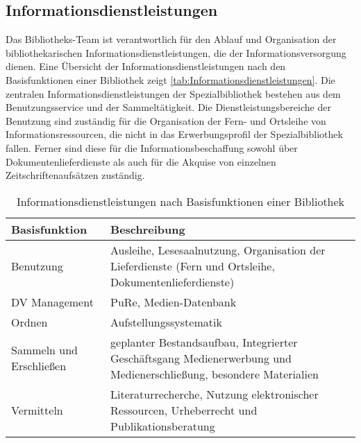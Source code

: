 \subsection{Informationsdienstleistungen}
Das Bibliotheks-Team ist verantwortlich für den Ablauf und Organisation der bibliothekarischen 
Informationsdienstleistungen, die der Informationsversorgung dienen. Eine Übersicht der Informationsdienstleistungen 
nach den Basisfunktionen einer Bibliothek\cite[S. 204 f.]{RN200} zeigt \autoref{tab:Informationsdienstleistungen}. 
Die zentralen Informationsdienstleistungen der Spezialbibliothek bestehen aus dem Benutzungsservice und der Sammeltätigkeit.
Die Dienstleistungsbereiche der Benutzung sind zuständig für die Organisation der Fern- und Ortsleihe 
von Informationsressourcen, die nicht in das Erwerbungsprofil der Spezialbibliothek fallen. 
Ferner sind diese für die Informationsbeschaffung sowohl über Dokumentenlieferdienste als auch für die 
Akquise von einzelnen Zeitschriftenaufsätzen zuständig.
\begingroup
\setlength{\tabcolsep}{12pt} %
\renewcommand{\arraystretch}{1.5} 
\begin{table}[h]
    \centering
    \begin{adjustbox}{max width=\textwidth}
    \begin{tabular}{p{}p{}}
       \toprule
       \textbf{Basisfunktion}          & \textbf{Beschreibung}\\
       \midrule
        Benutzung                               &Ausleihe, Lesesaalnutzung, Organisation der Lieferdienste (Fern und Ortsleihe, Dokumentenlieferdienste)\\
        DV Management                           &PuRe, Medien-Datenbank\\
        Ordnen                                  &Aufstellungssystematik\\
        Sammeln und Erschließen                 &geplanter Bestandsaufbau, Integrierter Geschäftsgang Medienerwerbung und Medienerschließung, besondere Materialien\\
        Vermitteln                              &Literaturrecherche, Nutzung elektronischer Ressourcen, Urheberrecht und Publikationsberatung\\
   
       \bottomrule
    \end{tabular}
    \end{adjustbox}
    \caption{%
        Informationsdienstleistungen nach Basisfunktionen einer Bibliothek
    }
    \label{tab:Informationsdienstleistungen}
    \end{table}
\endgroup

